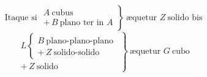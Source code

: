\documentclass[11pt,a4paper]{article}
\begin{document}
\[ \text{Itaque si } \left.\begin{array}{l} A\ \text{cubus} \\ +\,B\ \text{plano ter in } A \end{array}\right\}\ \text{æquetur } Z\ \text{solido bis} \]
\[ \left.\begin{array}{l} L \left\{\begin{array}{l} B\ \text{plano-plano-plano} \\ +\,Z\ \text{solido-solido} \end{array}\right. \\ +\,Z\ \text{solido} \end{array}\right\}\ \text{æquetur } G\ \text{cubo} \]
\end{document}
